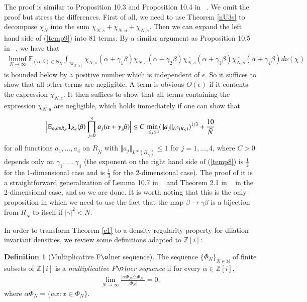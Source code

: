 \documentclass[12pt,amstex]{amsart}
\theoremstyle{definition}
\newtheorem{defn}[thm]{Definition}
\def \Z {\mathbb{Z}[i]}
\def \A {\alpha}
\def \B {\beta}
\def \C {\gamma}
\def \e {\epsilon}
\def \R {R_{\tilde{N}}}
\begin{document}
 The proof is similar to Proposition 10.3 and Proposition 10.4 in ~\cite{FH}. We omit the proof but stress the differences. First of all, we need to use Theorem \ref{nU3s} to decompose $\chi_{N}$ into the sum $\chi_{N,s}+\chi_{N,u}+\chi_{N,e}$. Then we can expand the left hand side of (\ref{temp9}) into 81 terms. By a similar argument as Proposition 10.5 in ~\cite{FH}, we have that
   \begin{equation}\nonumber
  \begin{split}
    \liminf_{N\rightarrow\infty}\mathbb{E}_{(\A,\B)\in\Theta_{N}}\int_{\mathcal{M}_{\Z}}{\chi_{N,s}(\A+\C_{1}\B)\chi_{N,s}(\A+\C_{2}\B)\overline{\chi_{N,s}}(\A+\C_{3}\B)
    \overline{\chi_{N,s}}(\A+\C_{4}\B)}d\nu(\chi)
  \end{split}
  \end{equation}
is bounded below by a positive number which is independent of $\e$. So
 it suffices to show that all other terms are negligible. A term is obvious $O(\e)$ if it contents the expression $\chi_{N,e}$. It then suffices to show that all terms containing the expression $\chi_{N,u}$ are negligible, which holds immediately if one can show that
      \begin{equation}\label{temp8}
    \begin{split}
      \Bigl\vert\mathbb{E}_{\A,\B\in \R}\bold{1}_{R_{N}}(\B)\prod_{j=0}^{3}a_{j}(\A+\C_{j}\B)\Bigr\vert
      \leq C\min_{1\leq j\leq 4}(\Vert a_{j}\Vert_{U^{3}(\R)})^{1/3}+\frac{10}{\tilde{N}}
    \end{split}
  \end{equation}
for all functions $a_{1},\dots,a_{4}$ on $\R$ with $\Vert a_{j}\Vert_{L^{\infty}(\R)}\leq 1$ for $j=1,\dots,4$, where $C>0$ depends only on $\C_{1},\dots,\C_{4}$ (the exponent on the right hand side of (\ref{temp8}) is $\frac{1}{2}$ for the 1-dimensional case and is $\frac{1}{3}$ for the 2-dimensional case). The proof of it is a straightforward generalization of Lemma 10.7 in ~\cite{FH} and Theorem 2.1 in ~\cite{FH} in the 2-dimensional case, and so we are done. It is worth noting that this is the only proposition in which we need to use the fact that 
the map $\B\to\C\B$ is a bijection from $\R$ to itself if $\vert\C\vert^{2}<\tilde{N}$.

In order to transform Theorem \ref{c1} to a density regularity property for dilation invariant densities,
we review some definitions adapted to $\Z$:

\begin{defn}[Multiplicative F${\o}$lner sequence]
  The sequence $\{\Phi_{N}\}_{N\in\mathbb{N}}$ of finite subsets of $\Z$ is a \emph{multiplicative F${\o}$lner sequence} if for every $\A\in\Z$,
  \begin{equation}\nonumber
  \begin{split}
    \lim_{N\rightarrow\infty}\frac{\vert \A\Phi_{N}\triangle\Phi_{N}\vert}{\vert \Phi_{N}\vert}=0,
  \end{split}
  \end{equation}
  where $\A\Phi_{N}=\{\A x\colon x\in\Phi_{N}\}$.
\end{defn}
\end{document}
